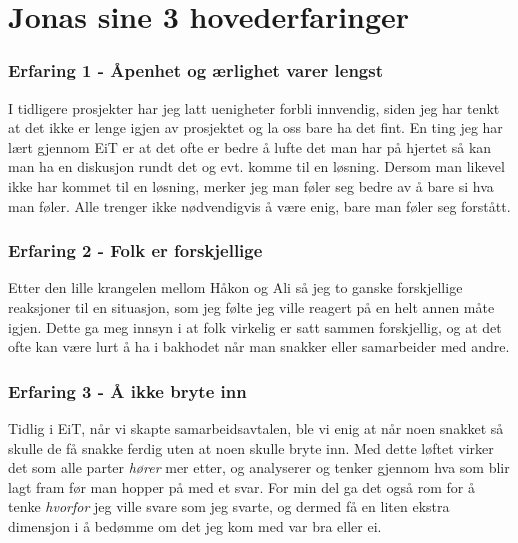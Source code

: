 \section{Jonas sine 3 hovederfaringer}

\subsubsection*{Erfaring 1 - Åpenhet og ærlighet varer lengst}

I tidligere prosjekter har jeg latt uenigheter forbli innvendig, siden jeg har tenkt at det ikke er lenge igjen av prosjektet og la oss bare ha det fint. En ting jeg har lært gjennom EiT er at det ofte er bedre å lufte det man har på hjertet så kan man ha en diskusjon rundt det og evt. komme til en løsning. Dersom man likevel ikke har kommet til en løsning, merker jeg man føler seg bedre av å bare si hva man føler. Alle trenger ikke nødvendigvis å være enig, bare man føler seg forstått.

\subsubsection*{Erfaring 2 - Folk er forskjellige}

Etter den lille krangelen mellom Håkon og Ali så jeg to ganske forskjellige reaksjoner til en situasjon, som jeg følte jeg ville reagert på en helt annen måte igjen. Dette ga meg innsyn i at folk virkelig er satt sammen forskjellig, og at det ofte kan være lurt å ha i bakhodet når man snakker eller samarbeider med andre.

\subsubsection*{Erfaring 3 - Å ikke bryte inn}

Tidlig i EiT, når vi skapte samarbeidsavtalen, ble vi enig at når noen snakket så skulle de få snakke ferdig uten at noen skulle bryte inn. Med dette løftet virker det som alle parter \textit{hører} mer etter, og analyserer og tenker gjennom hva som blir lagt fram før man hopper på med et svar. For min del ga det også rom for å tenke \textit{hvorfor} jeg ville svare som jeg svarte, og dermed få en liten ekstra dimensjon i å bedømme om det jeg kom med var bra eller ei. 
